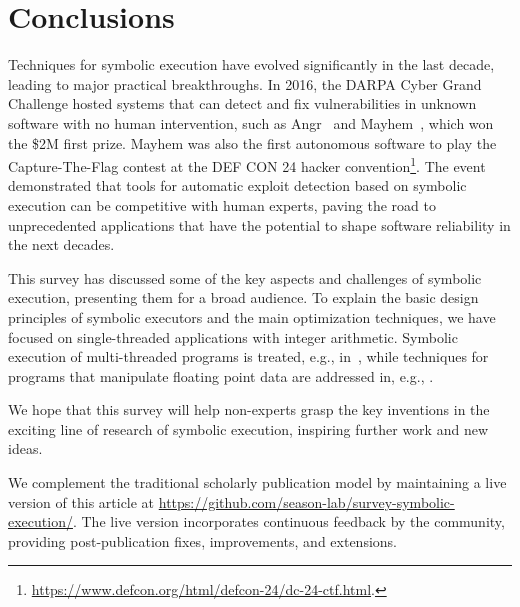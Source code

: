 
\vspace{-2pt} %
\section{Conclusions}
\label{se:conclusions}

Techniques for symbolic execution have evolved significantly in the last decade, leading to major practical breakthroughs. In 2016, the DARPA Cyber Grand Challenge hosted systems that can detect and fix vulnerabilities in unknown software with no human intervention, such as {\sc Angr}~\cite{ANGR-SSP16} and {\sc Mayhem}~\cite{MAYHEM-SP12}, which won the \$2M first prize. {\sc Mayhem} was also the first autonomous software to play the Capture-The-Flag contest at the DEF CON 24 hacker convention\footnote{\url{https://www.defcon.org/html/defcon-24/dc-24-ctf.html}.}. The event demonstrated that tools for automatic exploit detection based on symbolic execution can be competitive with human experts, paving the road to unprecedented applications %
that have the potential to shape software %
reliability in the next decades. 

This survey has discussed some of the key aspects and challenges of symbolic execution, presenting them for a broad audience. To explain the basic design principles of symbolic executors and the main optimization techniques, we have focused on single-threaded applications with integer arithmetic. Symbolic execution of multi-threaded programs is treated, e.g., 
{in~\cite{BGC-OOPSLA14}}, 
while techniques for programs that manipulate floating point data are addressed 
{in, e.g., \cite{RPW-SIGSOFT15}}.

We hope that this survey will help non-experts grasp the key inventions in the exciting line of research of symbolic execution, inspiring further work and new ideas.



\ifdefined\arxivver
{}
We complement the traditional scholarly publication model by maintaining a live version of this article at {\href{https://github.com/season-lab/survey-symbolic-execution}{https://github.com/season-lab/survey-symbolic-execution/}}. The live version incorporates continuous feedback by the community, providing post-publication fixes, improvements, and extensions.
\fi
